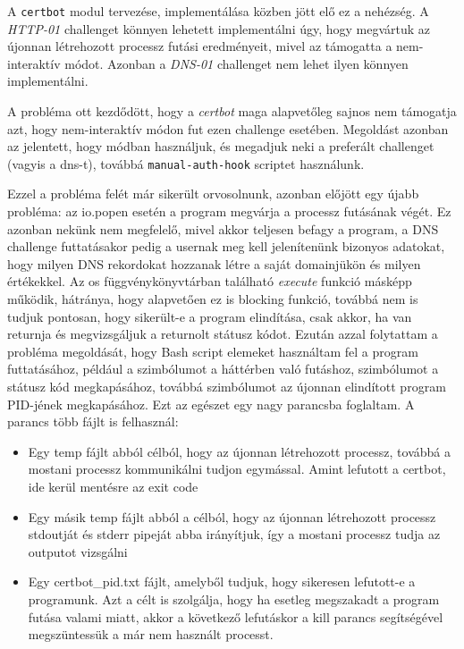 A \texttt{certbot} modul tervezése, implementálása közben jött elő ez a nehézség. A \textit{HTTP-01} challenget könnyen lehetett implementálni úgy, hogy megvártuk az újonnan létrehozott processz futási eredményeit, mivel az támogatta a nem-interaktív módot. Azonban a \textit{DNS-01} challenget nem lehet ilyen könnyen implementálni.

A probléma ott kezdődött, hogy a \textit{certbot} maga alapvetőleg sajnos nem támogatja azt, hogy nem-interaktív módon fut ezen challenge esetében. Megoldást azonban az jelentett, hogy \texttt{} módban használjuk, és megadjuk neki a preferált challenget (vagyis a dns-t), továbbá \texttt{manual-auth-hook} scriptet használunk. 


Ezzel a probléma felét már sikerült orvosolnunk, azonban előjött egy újabb probléma: az io.popen esetén a program megvárja a processz futásának végét. Ez azonban nekünk nem megfelelő, mivel akkor teljesen befagy a program, a DNS challenge futtatásakor pedig a usernak meg kell jelenítenünk bizonyos adatokat, hogy milyen DNS rekordokat hozzanak létre a saját domainjükön és milyen értékekkel. Az os függvénykönyvtárban található \textit{execute} funkció másképp működik, hátránya, hogy alapvetően ez is blocking funkció, továbbá nem is tudjuk pontosan, hogy sikerült-e a program elindítása, csak akkor, ha van returnja és megvizsgáljuk a returnolt státusz kódot.
Ezután azzal folytattam a probléma megoldását, hogy Bash script elemeket használtam fel a program futtatásához, például a \texttt{\detokenize{&}} szimbólumot a háttérben való futáshoz, \texttt{} szimbólumot a státusz kód megkapásához, továbbá \texttt{\detokenize{$!}} szimbólumot az újonnan elindított program PID-jének megkapásához. Ezt az egészet egy nagy parancsba foglaltam. A parancs több fájlt is felhasznál:
\begin{itemize}
	\item Egy temp fájlt abból célból, hogy az újonnan létrehozott processz, továbbá a mostani processz kommunikálni tudjon egymással. Amint lefutott a certbot, ide kerül mentésre az exit code
	\item Egy másik temp fájlt abból a célból, hogy az újonnan létrehozott processz stdoutját és stderr pipeját abba irányítjuk, így a mostani processz tudja az outputot vizsgálni
	\item Egy certbot\_pid.txt fájlt, amelyből tudjuk, hogy sikeresen lefutott-e a programunk. Azt a célt is szolgálja, hogy ha esetleg megszakadt a program futása valami miatt, akkor a következő lefutáskor a kill parancs segítségével megszüntessük a már nem használt processt.
\end{itemize}

